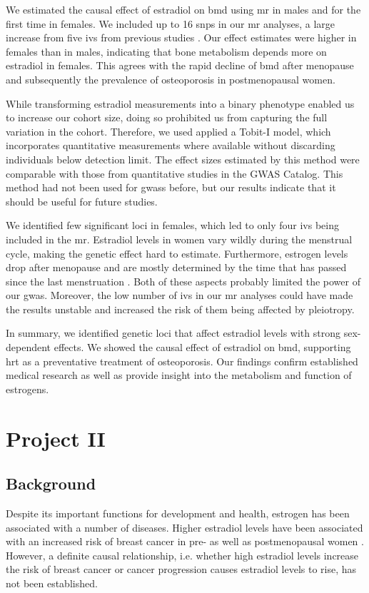 \documentclass[draft]{scrbook}
\begin{document}
We estimated the causal effect of estradiol on \gls{bmd} using \gls{mr} in males and for the first time in females.
We included up to 16 \glspl{snp} in our \gls{mr} analyses, a large increase from five \glspl{iv} from previous studies \cite{Nethander2018a}.
Our effect estimates were higher in females than in males, indicating that bone metabolism depends more on estradiol in females.
This agrees with the rapid decline of \gls{bmd} after menopause and subsequently the prevalence of osteoporosis in postmenopausal women.

While transforming estradiol measurements into a binary phenotype enabled us to increase our cohort size, doing so prohibited us from capturing the full variation in the cohort.
Therefore, we used applied a Tobit-I model, which incorporates quantitative measurements where available without discarding individuals below detection limit.
The effect sizes estimated by this method were comparable with those from quantitative studies in the GWAS Catalog.
This method had not been used for \glspl{gwas} before, but our results indicate that it should be useful for future studies.

We identified few significant loci in females, which led to only four \glspl{iv} being included in the \gls{mr}.
Estradiol levels in women vary wildly during the menstrual cycle, making the genetic effect hard to estimate.
Furthermore, estrogen levels drop after menopause and are mostly determined by the time that has passed since the last menstruation \cite{Richardson2020}.
Both of these aspects probably limited the power of our \gls{gwas}.
Moreover, the low number of \glspl{iv} in our \gls{mr} analyses could have made the results unstable and increased the risk of them being affected by pleiotropy.

In summary, we identified genetic loci that affect estradiol levels with strong sex-dependent effects.
We showed the causal effect of estradiol on \gls{bmd}, supporting \gls{hrt} as a preventative treatment of osteoporosis.
Our findings confirm established medical research as well as provide insight into the metabolism and function of estrogens.

\chapter{Project II}
\section{Background}
Despite its important functions for development and health, estrogen has been associated with a number of diseases.
Higher estradiol levels have been associated with an increased risk of breast cancer in pre- as well as postmenopausal women \cite{Key2013,Kaaks2005,Zhang2013,Kaaks2005a}.
However, a definite causal relationship, i.e. whether high estradiol levels increase the risk of breast cancer or cancer progression causes estradiol levels to rise, has not been established.
\end{document}
